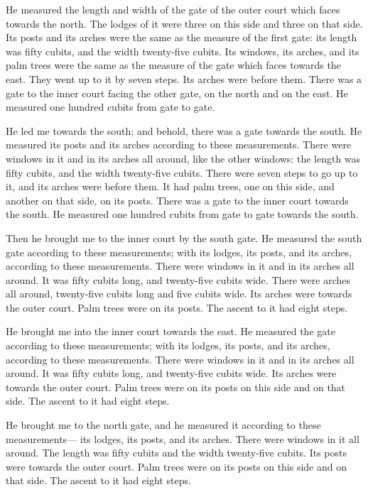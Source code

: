  He measured the length and width of the gate of the outer
court which faces towards the north.  The lodges of it were
three on this side and three on that side. Its posts and its arches were
the same as the measure of the first gate: its length was fifty cubits,
and the width twenty-five cubits.  Its windows, its arches,
and its palm trees were the same as the measure of the gate which faces
towards the east. They went up to it by seven steps. Its arches were
before them.  There was a gate to the inner court facing
the other gate, on the north and on the east. He measured one hundred
cubits from gate to gate.

 He led me towards the south; and behold, there was a gate
towards the south. He measured its posts and its arches according to
these measurements.  There were windows in it and in its
arches all around, like the other windows: the length was fifty cubits,
and the width twenty-five cubits.  There were seven steps
to go up to it, and its arches were before them. It had palm trees, one
on this side, and another on that side, on its posts. 
There was a gate to the inner court towards the south. He measured one
hundred cubits from gate to gate towards the south.

 Then he brought me to the inner court by the south gate.
He measured the south gate according to these measurements;
 with its lodges, its posts, and its arches, according to
these measurements. There were windows in it and in its arches all
around. It was fifty cubits long, and twenty-five cubits wide.
 There were arches all around, twenty-five cubits long and
five cubits wide.  Its arches were towards the outer court.
Palm trees were on its posts. The ascent to it had eight steps.

 He brought me into the inner court towards the east. He
measured the gate according to these measurements;  with
its lodges, its posts, and its arches, according to these measurements.
There were windows in it and in its arches all around. It was fifty
cubits long, and twenty-five cubits wide.  Its arches were
towards the outer court. Palm trees were on its posts on this side and
on that side. The ascent to it had eight steps.

 He brought me to the north gate, and he measured it
according to these measurements---  its lodges, its posts,
and its arches. There were windows in it all around. The length was
fifty cubits and the width twenty-five cubits.  Its posts
were towards the outer court. Palm trees were on its posts on this side
and on that side. The ascent to it had eight steps.

